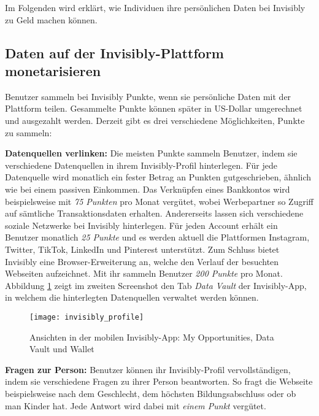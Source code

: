 \noindent Im Folgenden wird erklärt, wie Individuen ihre persönlichen Daten bei Invisibly zu Geld machen können.

\subsection{Daten auf der Invisibly-Plattform monetarisieren}
Benutzer sammeln bei Invisibly Punkte, wenn sie persönliche Daten mit der Plattform teilen. Gesammelte Punkte können später in US-Dollar umgerechnet und ausgezahlt werden. Derzeit gibt es drei verschiedene Möglichkeiten, Punkte zu sammeln: \newline

\noindent \textbf{Datenquellen verlinken:} Die meisten Punkte sammeln Benutzer, indem sie verschiedene Datenquellen in ihrem Invisibly-Profil hinterlegen. Für jede Datenquelle wird monatlich ein fester Betrag an Punkten gutgeschrieben, ähnlich wie bei einem passiven Einkommen. \cite{pymntsInvisibly_2021} Das Verknüpfen eines Bankkontos wird beispielsweise mit \textit{75 Punkten} pro Monat vergütet, wobei Werbepartner so Zugriff auf sämtliche Transaktionsdaten erhalten. Andererseits lassen sich verschiedene soziale Netzwerke bei Invisibly hinterlegen. Für jeden Account erhält ein Benutzer monatlich \textit{25 Punkte} und es werden aktuell die Plattformen Instagram, Twitter, TikTok, LinkedIn und Pinterest unterstützt. Zum Schluss bietet Invisibly eine Browser-Erweiterung an, welche den Verlauf der besuchten Webseiten aufzeichnet. Mit ihr sammeln Benutzer \textit{200 Punkte} pro Monat. \cite{instagramInvisibly_2021, lifewireInvisibly_2021} Abbildung \ref{fig:invisiblyProfile} zeigt im zweiten Screenshot den Tab \textit{Data Vault} der Invisibly-App, in welchem die hinterlegten Datenquellen verwaltet werden können. \newline

\begin{figure}[!ht]
	\centering
	\texttt{[image: invisibly\_profile]}
	\caption{Ansichten in der mobilen Invisibly-App: My Opportunities, Data Vault und Wallet \cite{behanceInvisibly_2021}}
	\label{fig:invisiblyProfile}
\end{figure}
\FloatBarrier

\noindent \textbf{Fragen zur Person:} Benutzer können ihr Invisibly-Profil vervollständigen, indem sie verschiedene Fragen zu ihrer Person beantworten. So fragt die Webseite beispielsweise nach dem Geschlecht, dem höchsten Bildungsabschluss oder ob man Kinder hat. Jede Antwort wird dabei mit \textit{einem Punkt} vergütet. \cite{instagramInvisibly_2021} \newline

